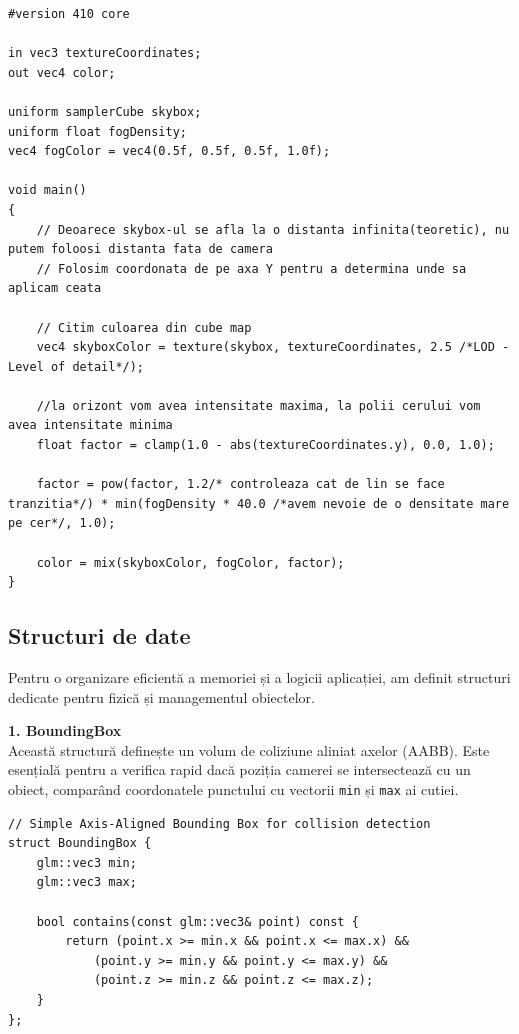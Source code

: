 \documentclass[11pt,a4paper]{article}
\begin{document}
\begin{verbatim}
#version 410 core

in vec3 textureCoordinates;
out vec4 color;

uniform samplerCube skybox;
uniform float fogDensity;
vec4 fogColor = vec4(0.5f, 0.5f, 0.5f, 1.0f);

void main()
{
    // Deoarece skybox-ul se afla la o distanta infinita(teoretic), nu putem foloosi distanta fata de camera
    // Folosim coordonata de pe axa Y pentru a determina unde sa aplicam ceata
    
    // Citim culoarea din cube map 
    vec4 skyboxColor = texture(skybox, textureCoordinates, 2.5 /*LOD - Level of detail*/);

    //la orizont vom avea intensitate maxima, la polii cerului vom avea intensitate minima
    float factor = clamp(1.0 - abs(textureCoordinates.y), 0.0, 1.0);
    
    factor = pow(factor, 1.2/* controleaza cat de lin se face tranzitia*/) * min(fogDensity * 40.0 /*avem nevoie de o densitate mare pe cer*/, 1.0);
    
    color = mix(skyboxColor, fogColor, factor);
}
\end{verbatim}

\subsection{Structuri de date}
Pentru o organizare eficientă a memoriei și a logicii aplicației, am definit structuri dedicate pentru fizică și managementul obiectelor.

\textbf{1. BoundingBox} \\
Această structură definește un volum de coliziune aliniat axelor (AABB). Este esențială pentru a verifica rapid dacă poziția camerei se intersectează cu un obiect, comparând coordonatele punctului cu vectorii \texttt{min} și \texttt{max} ai cutiei. 

\begin{verbatim}
// Simple Axis-Aligned Bounding Box for collision detection
struct BoundingBox {
    glm::vec3 min;
    glm::vec3 max;

    bool contains(const glm::vec3& point) const {
        return (point.x >= min.x && point.x <= max.x) &&
            (point.y >= min.y && point.y <= max.y) &&
            (point.z >= min.z && point.z <= max.z);
    }
};
\end{verbatim}
\end{document}
